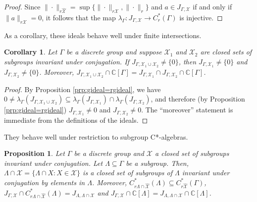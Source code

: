 \documentclass[a4paper, 12pt]{amsart}
\newtheorem{cor}[thm]{Corollary}
\newtheorem{prp}[thm]{Proposition}
\theoremstyle{definition}
\theoremstyle{remark}
\numberwithin{equation}{section}
\begin{document}
\begin{proof}
    Since $\|\cdot\|_{r\hat{\mathcal{X}}} = \sup\{\|\cdot\|_{r\mathcal{X}}, \|\cdot\|_{r}\}$ and $a\in J_{\Gamma,\mathcal{X}}$ if and only if $\|a\|_{r\mathcal{X}} = 0$, it follows that the map $\lambda_{\Gamma}:J_{\Gamma,\mathcal{X}}\to C^{*}_{r}(\Gamma)$ is injective.
\end{proof}
As a corollary, these ideals behave well under finite intersections.

\begin{cor}
\label{cor:gidealunion=int}
Let $\Gamma$ be a discrete group and suppose $\mathcal{X}_{1}$ and $\mathcal{X}_{2}$ are closed sets of subgroups invariant under conjugation. If $J_{\Gamma, \mathcal{X}_{1}\cup\mathcal{X}_{2}}\neq \{0\}$, then $J_{\Gamma, \mathcal{X}_{1}}\neq \{0\}$ and $J_{\Gamma, \mathcal{X}_{2}}\neq \{0\}$. Moreover, $J_{\Gamma,\mathcal{X}_{1}\cup\mathcal{X}_{2}}\cap\mathbb{C}[\Gamma] = J_{\Gamma, \mathcal{X}_{1}}\cap J_{\Gamma,\mathcal{X}_{2}}\cap \mathbb{C}[\Gamma]$.
\end{cor}

\begin{proof}
    By Proposition \ref{prp:gideal=rgideal}, we have $0\neq \lambda_{\Gamma}(J_{\Gamma, \mathcal{X}_{1}\cup\mathcal{X}_{2}})\subseteq \lambda_{\Gamma}(J_{\Gamma,\mathcal{X}_{1}})\cap \lambda_{\Gamma}(J_{\Gamma,\mathcal{X}_{2}})$, and therefore (by Proposition \ref{prp:gideal=rgideal}) $J_{\Gamma,\mathcal{X}_{1}}\neq 0$ and $J_{\Gamma,\mathcal{X}_{2}}\neq 0$. The ``moreover'' statement is immediate from the definitions of the ideals.
\end{proof}

They behave well under restriction to subgroup C*-algebras.

\begin{prp}
\label{prp:resttosg}
    Let $\Gamma$ be a discrete group and $\mathcal{X}$ a closed set of subgroups invariant under conjugation. Let $\Lambda\subseteq \Gamma$ be a subgroup. Then, $\Lambda\cap\mathcal{X} = \{\Lambda\cap X:X\in\mathcal{X}\}$ is a closed set of subgroups of $\Lambda$ invariant under conjugation by elements in $\Lambda$. Moreover, $C^{*}_{r\Lambda\cap\hat{\mathcal{X}}}(\Lambda)\subseteq C^{*}_{r\hat{\mathcal{X}}}(\Gamma)$, $J_{\Gamma,\mathcal{X}}\cap C^{*}_{r\Lambda\cap\hat{\mathcal{X}}}(\Lambda) = J_{\Lambda, \Lambda\cap\mathcal{X}}$ and $J_{\Gamma,\mathcal{X}}\cap\mathbb{C}[\Lambda] = J_{\Lambda, \Lambda\cap \mathcal{X}}\cap\mathbb{C}[\Lambda]$.
\end{prp}
\end{document}
